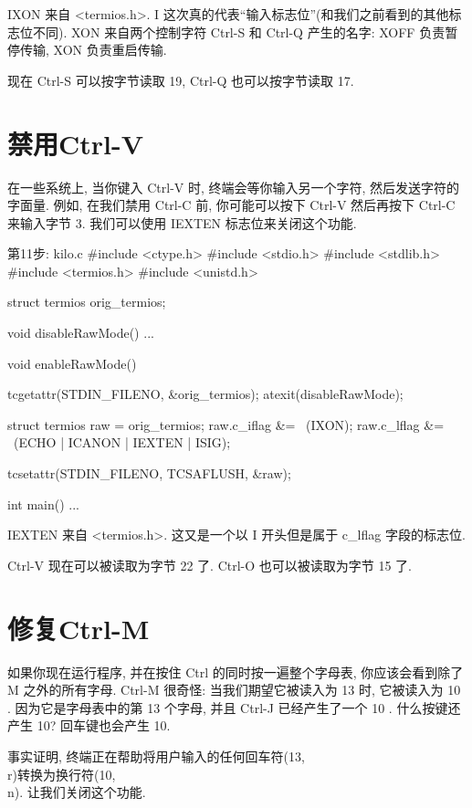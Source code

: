 \documentclass[lang=cn,newtx,10pt,scheme=chinese]{elegantbook}
\begin{document}
IXON 来自 <termios.h>. I 这次真的代表``输入标志位''(和我们之前看到的其他标志位不同). XON 来自两个控制字符 Ctrl-S 和 Ctrl-Q 产生的名字: XOFF 负责暂停传输, XON 负责重启传输.

现在 Ctrl-S 可以按字节读取 19, Ctrl-Q 也可以按字节读取 17.

\section{禁用Ctrl-V}

在一些系统上, 当你键入 Ctrl-V 时, 终端会等你输入另一个字符, 然后发送字符的字面量. 例如, 在我们禁用 Ctrl-C 前, 你可能可以按下 Ctrl-V 然后再按下 Ctrl-C 来输入字节 3. 我们可以使用 IEXTEN 标志位来关闭这个功能.

\begin{mycode}{第11步: kilo.c}
#include <ctype.h>
#include <stdio.h>
#include <stdlib.h>
#include <termios.h>
#include <unistd.h>

struct termios orig_termios;

void disableRawMode() { ... }

void enableRawMode() {
  tcgetattr(STDIN_FILENO, &orig_termios);
  atexit(disableRawMode);

  struct termios raw = orig_termios;
  raw.c_iflag &= ~(IXON);
  raw.c_lflag &= ~(ECHO | ICANON | IEXTEN | ISIG);

  tcsetattr(STDIN_FILENO, TCSAFLUSH, &raw);
}

int main() { ... }
\end{mycode}

IEXTEN 来自 <termios.h>. 这又是一个以 I 开头但是属于 c\_lflag 字段的标志位.

Ctrl-V 现在可以被读取为字节 22 了. Ctrl-O 也可以被读取为字节 15 了.

\section{修复Ctrl-M}

如果你现在运行程序, 并在按住 Ctrl 的同时按一遍整个字母表, 你应该会看到除了 M 之外的所有字母. Ctrl-M 很奇怪: 当我们期望它被读入为 13 时, 它被读入为 10 . 因为它是字母表中的第 13 个字母, 并且 Ctrl-J 已经产生了一个 10 . 什么按键还产生 10? 回车键也会产生 10.

事实证明, 终端正在帮助将用户输入的任何回车符(13, \\r)转换为换行符(10, \\n). 让我们关闭这个功能.
\end{document}
